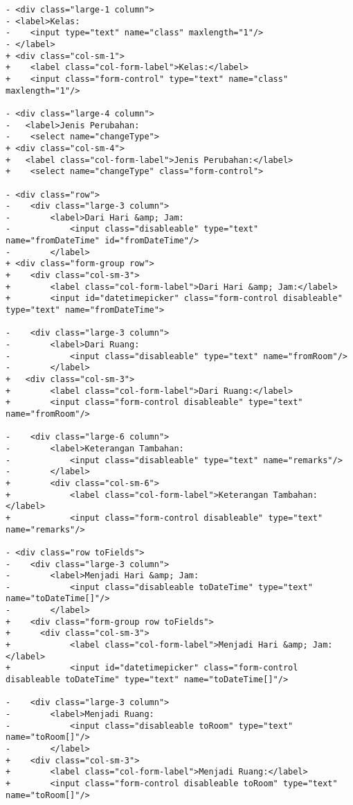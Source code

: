 \begin{lstlisting}
- <div class="large-1 column">
- <label>Kelas:
-    <input type="text" name="class" maxlength="1"/>
- </label>
+ <div class="col-sm-1">
+    <label class="col-form-label">Kelas:</label>
+    <input class="form-control" type="text" name="class" maxlength="1"/>

- <div class="large-4 column">
-   <label>Jenis Perubahan:
-    <select name="changeType">
+ <div class="col-sm-4">
+   <label class="col-form-label">Jenis Perubahan:</label>
+    <select name="changeType" class="form-control">

- <div class="row">
-    <div class="large-3 column">
-        <label>Dari Hari &amp; Jam:
-            <input class="disableable" type="text" name="fromDateTime" id="fromDateTime"/>
-        </label>
+ <div class="form-group row">
+    <div class="col-sm-3">
+        <label class="col-form-label">Dari Hari &amp; Jam:</label>
+        <input id="datetimepicker" class="form-control disableable" type="text" name="fromDateTime">

-    <div class="large-3 column">
-        <label>Dari Ruang:
-            <input class="disableable" type="text" name="fromRoom"/>
-        </label>
+   <div class="col-sm-3">
+        <label class="col-form-label">Dari Ruang:</label>
+        <input class="form-control disableable" type="text" name="fromRoom"/>

-    <div class="large-6 column">
-        <label>Keterangan Tambahan:
-            <input class="disableable" type="text" name="remarks"/>
-        </label>
+        <div class="col-sm-6">
+            <label class="col-form-label">Keterangan Tambahan:</label>
+            <input class="form-control disableable" type="text" name="remarks"/>

- <div class="row toFields">
-    <div class="large-3 column">
-        <label>Menjadi Hari &amp; Jam:
-            <input class="disableable toDateTime" type="text" name="toDateTime[]"/>
-        </label>
+    <div class="form-group row toFields">
+      <div class="col-sm-3">
+            <label class="col-form-label">Menjadi Hari &amp; Jam:</label>
+            <input id="datetimepicker" class="form-control disableable toDateTime" type="text" name="toDateTime[]"/>

-    <div class="large-3 column">
-        <label>Menjadi Ruang:
-            <input class="disableable toRoom" type="text" name="toRoom[]"/>
-        </label>
+    <div class="col-sm-3">
+        <label class="col-form-label">Menjadi Ruang:</label>
+        <input class="form-control disableable toRoom" type="text" name="toRoom[]"/>


\end{lstlisting}
